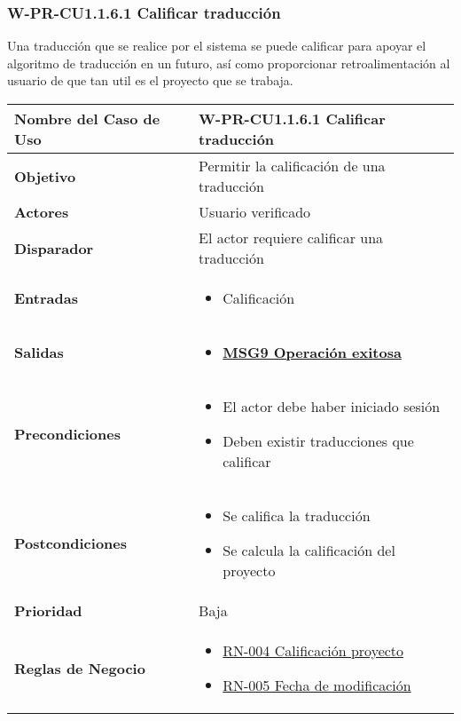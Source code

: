 \subsubsection{W-PR-CU1.1.6.1 Calificar traducción}
Una traducción que se realice por el sistema se puede calificar para apoyar el algoritmo de traducción en un futuro, así como proporcionar retroalimentación al usuario de que tan util es el proyecto que se trabaja.
\begin{longtable}{|J{5cm}|J{10.3cm}|}
	\hline
	\textbf{Nombre del Caso de Uso} &
		W-PR-CU1.1.6.1 Calificar traducción \\ \hline
	\textbf{Objetivo} &
		Permitir la calificación de una traducción  \\ \hline
	\textbf{Actores} &
		Usuario verificado \\ \hline 
	\textbf{Disparador} & 
		El actor requiere calificar una traducción \\ \hline 
	\textbf{Entradas} & 
		\begin{itemize}
		    \item Calificación
		\end{itemize} \\ \hline
	\textbf{Salidas} &
	    \begin{itemize}
		    \item \hyperref[MSG9]{\bf MSG9 Operación exitosa}
		\end{itemize} \\ \hline
	\textbf{Precondiciones} &
		\begin{itemize}
		    \item El actor debe haber iniciado sesión
		    \item Deben existir traducciones que calificar
		\end{itemize} \\ \hline
	\textbf{Postcondiciones} &
        \begin{itemize}
		    \item Se califica la traducción
		    \item Se calcula la calificación del proyecto
		\end{itemize} \\ \hline
	\textbf{Prioridad} & 
		Baja \\ \hline
	\textbf{Reglas de Negocio} & 
		\begin{itemize}
		    \item \hyperref[RN004]{RN-004 Calificación proyecto}
		    \item \hyperref[RN005]{RN-005 Fecha de modificación}
		\end{itemize} \\ \hline

\end{longtable}

